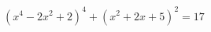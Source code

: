 \begin{ex}[type=equation]
	\begin{condition}
		\( (x^4-2x^2+2)^4+(x^2+2x+5)^2=17 \)
	\end{condition}
\end{ex}